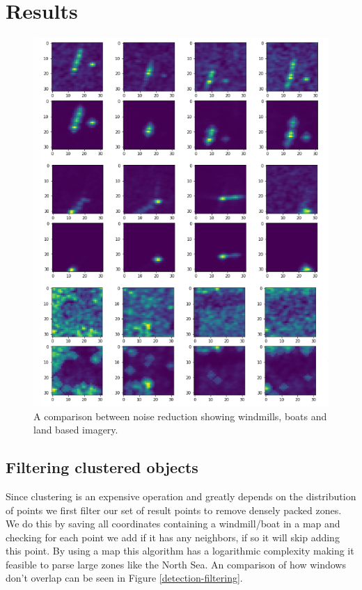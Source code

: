 \section{Results}
%

\begin{figure}[ht]
\begin{center}
\centerline{\includegraphics[width=\columnwidth]{images/denoise-final.png}}
\caption{A comparison between noise reduction showing windmills, boats and land based imagery.}
\label{noise-reduction-results}
\end{center}
\end{figure}

\subsection{Filtering clustered objects}

Since clustering is an expensive operation and greatly depends on the distribution of points we first filter our set of result points to remove densely packed zones. We do this by saving all coordinates containing a windmill/boat in a map and checking for each point we add if it has any neighbors, if so it will skip adding this point. By using a map this algorithm has a logarithmic complexity making it feasible to parse large zones like the North Sea. An comparison of how windows don't overlap can be seen in Figure \ref{detection-filtering}.

